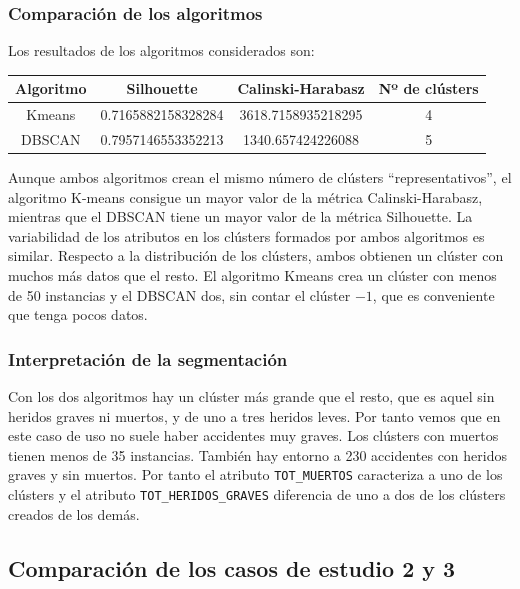 \documentclass[a4]{article}
\begin{document}
\subsubsection{Comparación de los algoritmos}

Los resultados de los algoritmos considerados son:

\begin{center}
\begin{tabular}{|c|c|c|c|}
\hline
  \multicolumn{1}{|c|}{\textbf{Algoritmo}} & \textbf{Silhouette} & \textbf{Calinski-Harabasz} &  \textbf{Nº de clústers}\\ \hline
 Kmeans & 0.7165882158328284 & 3618.7158935218295 & 4 \\ \hline
 DBSCAN & 0.7957146553352213 & 1340.657424226088  & 5 \\ \hline
\end{tabular}
\end{center}

Aunque ambos algoritmos crean el mismo número de clústers ``representativos'', el algoritmo K-means consigue un mayor valor de la métrica Calinski-Harabasz, mientras que el DBSCAN tiene un mayor valor de la métrica Silhouette. La variabilidad de los atributos en los clústers formados por ambos algoritmos es similar. Respecto a la distribución de los clústers, ambos obtienen un clúster con muchos más datos que el resto. El algoritmo Kmeans crea un clúster con menos de 50 instancias y el DBSCAN dos, sin contar el clúster $-1$, que es conveniente que tenga pocos datos.

\subsubsection{Interpretación de la segmentación}

Con los dos algoritmos hay un clúster más grande que el resto, que es aquel sin heridos graves ni muertos, y de uno a tres heridos leves. Por tanto vemos que en este caso de uso no suele haber accidentes muy graves. Los clústers con muertos tienen menos de 35 instancias. También hay entorno a 230 accidentes con heridos graves y sin muertos. Por tanto el atributo \texttt{TOT\_MUERTOS} caracteriza a uno de los clústers y el atributo \texttt{TOT\_HERIDOS\_GRAVES} diferencia de uno a dos de los clústers creados de los demás.

\newpage
\subsection{Comparación de los casos de estudio 2 y 3}
\end{document}
